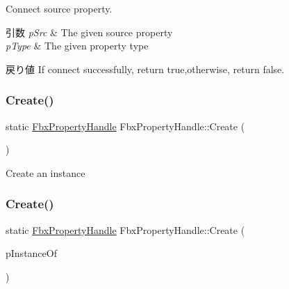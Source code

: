 Connect source property. 
\begin{DoxyParams}{引数}
{\em p\+Src} & The given source property \\
\hline
{\em p\+Type} & The given property type \\
\hline
\end{DoxyParams}
\begin{DoxyReturn}{戻り値}
If connect successfully, return true,otherwise, return false. 
\end{DoxyReturn}
\mbox{\label{class_fbx_property_handle_a347190a2078177d88598a7cd898eb811}} 
\subsubsection{\texorpdfstring{Create()}{Create()}\hspace{0.1cm}{\footnotesize\ttfamily [1/4]}}
{\footnotesize\ttfamily static \hyperlink{class_fbx_property_handle}{Fbx\+Property\+Handle} Fbx\+Property\+Handle\+::\+Create (\begin{DoxyParamCaption}{ }\end{DoxyParamCaption})\hspace{0.3cm}{\ttfamily [static]}}



Create an instance 

\mbox{\label{class_fbx_property_handle_a0bd5893a117b68102c6ce852c6910859}} 
\subsubsection{\texorpdfstring{Create()}{Create()}\hspace{0.1cm}{\footnotesize\ttfamily [2/4]}}
{\footnotesize\ttfamily static \hyperlink{class_fbx_property_handle}{Fbx\+Property\+Handle} Fbx\+Property\+Handle\+::\+Create (\begin{DoxyParamCaption}\item[{const \hyperlink{class_fbx_property_handle}{Fbx\+Property\+Handle} \&}]{p\+Instance\+Of }\end{DoxyParamCaption})\hspace{0.3cm}{\ttfamily [static]}}

